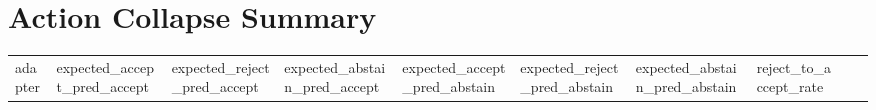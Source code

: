 \section{Action Collapse Summary}\label{action-collapse-summary}

{\def\LTcaptype{none} %
\begin{longtable}[]{@{}
  >{\raggedright\arraybackslash}p{}
  >{\raggedright\arraybackslash}p{}
  >{\raggedright\arraybackslash}p{}
  >{\raggedright\arraybackslash}p{}
  >{\raggedright\arraybackslash}p{}
  >{\raggedright\arraybackslash}p{}
  >{\raggedright\arraybackslash}p{}
  >{\raggedright\arraybackslash}p{}
  >{\raggedright\arraybackslash}p{}
  >{\raggedright\arraybackslash}p{}@{}}
\toprule\noalign{}
\begin{minipage}[b]{\linewidth}\raggedright
adapter
\end{minipage} & \begin{minipage}[b]{\linewidth}\raggedright
expected\_accept\_pred\_accept
\end{minipage} & \begin{minipage}[b]{\linewidth}\raggedright
expected\_reject\_pred\_accept
\end{minipage} & \begin{minipage}[b]{\linewidth}\raggedright
expected\_abstain\_pred\_accept
\end{minipage} & \begin{minipage}[b]{\linewidth}\raggedright
expected\_accept\_pred\_abstain
\end{minipage} & \begin{minipage}[b]{\linewidth}\raggedright
expected\_reject\_pred\_abstain
\end{minipage} & \begin{minipage}[b]{\linewidth}\raggedright
expected\_abstain\_pred\_abstain
\end{minipage} & \begin{minipage}[b]{\linewidth}\raggedright
reject\_to\_accept\_rate
\end{minipage} & \begin{minipage}[b]{\linewidth}\raggedright

\end{minipage}
\end{longtable}}
